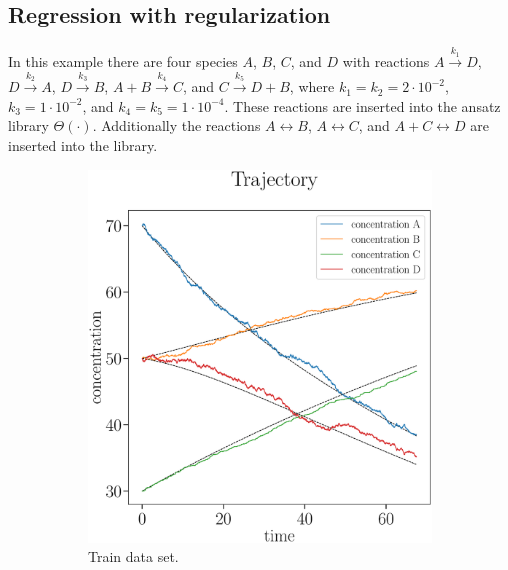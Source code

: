 \documentclass[oneside, abstracton, titlepage]{scrartcl}
\begin{document}
	\subsection{Regression with regularization}
	\label{sec:ex2}
	In this example there are four species $A$, $B$, $C$, and $D$ with reactions $A\xrightarrow{k_1}D$, $D\xrightarrow{k_2}A$, $D\xrightarrow{k_3}B$, $A+B\xrightarrow{k_4}C$, and $C\xrightarrow{k_5}D+B$, where $k_1=k_2=2\cdot 10^{-2}$, $k_3 = 1\cdot 10^{-2}$, and $k_4=k_5=1\cdot 10^{-4}$. These reactions are inserted into the ansatz library $\Theta (\cdot)$. Additionally the reactions $A\leftrightarrow B$, $A\leftrightarrow C$, and $A+C\leftrightarrow D$ are inserted into the library.
	
	\begin{figure}
		\centering
		\begin{subfigure}[b]{.45\textwidth}
			\includegraphics[width=\textwidth]{./figures_tex/cv_concentrations_train}
			\caption{Train data set.}
		\end{subfigure}
		~
		\begin{subfigure}[b]{.45\textwidth}

\end{subfigure}
\end{figure}
\end{document}
